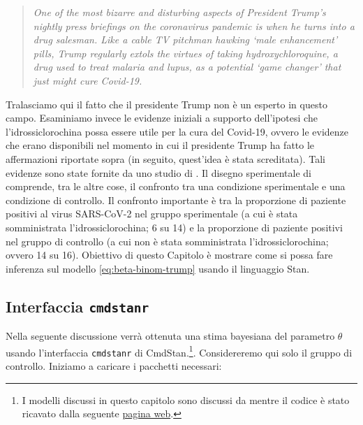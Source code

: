 \documentclass[
  10pt,
  italian,
  a4paper,
  extrafontsizes,onecolumn,openright
  ]{memoir}
\newlength{\rf}
\begin{document}
\begin{quote}
\emph{One of the most bizarre and disturbing aspects of President Trump's nightly press briefings on the coronavirus pandemic is when he turns into a drug salesman. Like a cable TV pitchman hawking `male enhancement' pills, Trump regularly extols the virtues of taking hydroxychloroquine, a drug used to treat malaria and lupus, as a potential `game changer' that just might cure Covid-19.}
\end{quote}

Tralasciamo qui il fatto che il presidente Trump non è un esperto in questo campo. Esaminiamo invece le evidenze iniziali a supporto dell'ipotesi che l'idrossiclorochina possa essere utile per la cura del Covid-19, ovvero le evidenze che erano disponibili nel momento in cui il presidente Trump ha fatto le affermazioni riportate sopra (in seguito, quest'idea è stata screditata). Tali evidenze sono state fornite da uno studio di \textcite{Gautret_2020}.
Il disegno sperimentale di \textcite{Gautret_2020} comprende, tra le altre cose, il confronto tra una condizione sperimentale e una condizione di controllo. Il confronto importante è tra la proporzione di paziente positivi al virus SARS-CoV-2 nel gruppo sperimentale (a cui è stata somministrata l'idrossiclorochina; 6 su 14) e la proporzione di paziente positivi nel gruppo di controllo (a cui non è stata somministrata l'idrossiclorochina; ovvero 14 su 16). Obiettivo di questo Capitolo è mostrare come si possa fare inferenza sul modello \eqref{eq:beta-binom-trump} usando il linguaggio Stan.

\hypertarget{cmdstanr-gautret}{%
\subsection{\texorpdfstring{Interfaccia \texttt{cmdstanr}}{Interfaccia cmdstanr}}\label{cmdstanr-gautret}}

Nella seguente discussione verrà ottenuta una stima bayesiana del parametro \(\theta\) usando l'interfaccia \texttt{cmdstanr} di CmdStan.\footnote{I modelli discussi in questo capitolo sono discussi da \textcite{gelman1995bayesian} mentre il codice è stato ricavato dalla seguente \href{http://avehtari.github.io/BDA_R_demos/demos_rstan/rstan_demo.html}{pagina web}.}. Considereremo qui solo il gruppo di controllo. Iniziamo a caricare i pacchetti necessari:
\end{document}
